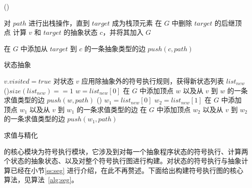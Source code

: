 \begin{algorithm}[htbp]
   \Else() { 
    对 $path$ 进行出栈操作，直到 $target$ 成为栈顶元素\;
    在 $G$ 中删除 $target$ 的后继顶点\;
    计算 $v$ 和 $target$ 的抽象状态 $c$，并将其加入 $G$\;

     {
      在 $G$ 中添加从 $target$ 到 $c$ 的一条抽象类型的边\;
      $push(c,path)$\;
    } 
  }
\caption{状态抽象}
\label{alg:abstraction}
\end{algorithm}

\begin{algorithm}[htbp]
  $v.visited = true$\;
  对状态 $v$ 应用除抽象外的符号执行规则，获得新状态列表 $list_{new}$\;
  \uIf(){$size(list_{new}) == 1$ } {
    $w = list_{new}[0]$\;
    在 $G$ 中添加顶点 $w$ 以及从 $v$ 到 $w$ 的一条求值类型的边\;
    $push(w,path)$\;
  } \Else() {
    $w_1 = list_{new}[0]$\;
    $w_2 = list_{new}[1]$\;
    在 $G$ 中添加顶点 $w_1$ 以及从 $v$ 到 $w_1$ 的一条求值类型的边\;
    在 $G$ 中添加顶点 $w_2$ 以及从 $v$ 到 $w_2$ 的一条求值类型的边\;
    $push(w_1,path)$\;
  }
\caption{求值与精化}
\label{alg:evaluation}
\end{algorithm}

\CTerm 的核心模块为符号执行模块，它涉及到对每一个抽象程序状态的符号执行、计算两个状态的抽象状态、以及对整个符号执行图进行构建。对状态的符号执行与抽象计算已经在小节\ref{ss:seg} 进行介绍，在此不再赘述。下面给出构建符号执行图的核心算法，见算法~\ref{alg:seg}。 

